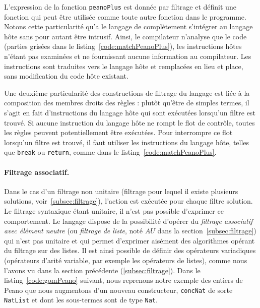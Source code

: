 L'expression de la fonction \texttt{peanoPlus} est donnée par filtrage et
définit une fonction {\java} qui peut être utilisée comme toute autre fonction
{\java} dans le programme.
Notons cette
particularité qu'a le langage {\tom} de complètement s'intégrer au langage hôte
sans pour autant être intrusif. Ainsi, le compilateur {\tom} n'analyse que le
code {\tom} (parties grisées dans le listing~\ref{code:matchPeanoPlus}), les
instructions hôtes n'étant pas examinées et ne fournissant aucune information
au compilateur. Les instructions {\tom} sont traduites vers le langage hôte
et remplacées en lieu et place, sans modification du code hôte existant.

Une deuxième particularité des constructions de filtrage du langage {\tom} est
liée à la composition des membres droits des règles : plutôt qu'être de simples
termes, il s'agit en fait d'instructions du langage hôte qui sont exécutées
lorsqu'un filtre est trouvé. Si aucune instruction du langage hôte ne rompt le
flot de contrôle, toutes les règles peuvent potentiellement être exécutées.
Pour interrompre ce flot lorsqu'un filtre est trouvé, il faut utiliser les
instructions {\adhoc} du langage hôte, telles que \texttt{break} ou
\texttt{return}, comme dans le listing~\ref{code:matchPeanoPlus}.




\paragraph{Filtrage associatif.} Dans le cas d'un filtrage non unitaire
(filtrage pour lequel il existe plusieurs solutions,
voir~\ref{subsec:filtrage}), l'action est exécutée pour chaque filtre
solution. Le filtrage syntaxique étant unitaire, il n'est pas possible
d'exprimer ce comportement. Le langage {\tom} dispose de la possibilité
d'opérer du \emph{filtrage associatif avec élément neutre} (ou \emph{filtrage
de liste}, noté $AU$ dans la section~\ref{subsec:filtrage}) qui n'est pas
unitaire et qui permet d'exprimer aisément des algorithmes opérant du filtrage
sur des listes. Il est ainsi possible de définir des opérateurs variadiques
(opérateurs d'arité variable, par exemple les opérateurs de listes), comme nous
l'avons vu dans la section précédente (\ref{subsec:filtrage}). Dans le
listing~\ref{code:gomPeano} suivant, nous reprenons notre exemple des entiers
de Peano que nous augmentons d'un nouveau constructeur, \texttt{concNat} de
sorte \texttt{NatList} et dont les sous-termes sont de type \texttt{Nat}.

